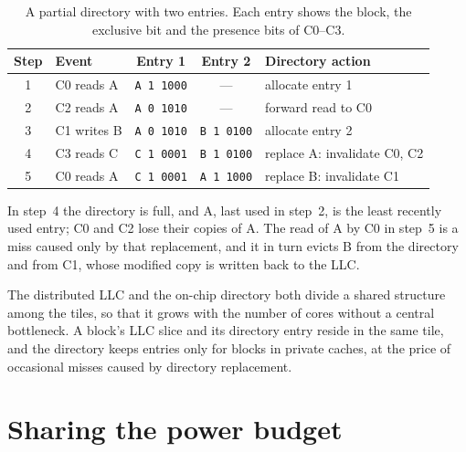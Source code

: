 \documentclass[../main.tex]{subfiles}
\begin{document}
\begin{table}[htbp]
  \centering\small
  \caption{A partial directory with two entries.  Each entry shows the
    block, the exclusive bit and the presence bits of C0--C3.}
  \label{tab:l22-directory-trace}
  \begin{tabular}{@{}clccl@{}}
    \toprule
    Step & Event & Entry 1 & Entry 2 & Directory action \\
    \midrule
    1 & C0 reads A  & \texttt{A 1 1000} & ---               & allocate entry 1 \\
    2 & C2 reads A  & \texttt{A 0 1010} & ---               & forward read to C0 \\
    3 & C1 writes B & \texttt{A 0 1010} & \texttt{B 1 0100} & allocate entry 2 \\
    4 & C3 reads C  & \texttt{C 1 0001} & \texttt{B 1 0100} & replace A: invalidate C0, C2 \\
    5 & C0 reads A  & \texttt{C 1 0001} & \texttt{A 1 1000} & replace B: invalidate C1 \\
    \bottomrule
  \end{tabular}
\end{table}

In step~4 the directory is full, and A, last used in step~2, is the least
recently used entry; C0 and C2 lose their copies of A.  The read of A by C0
in step~5 is a miss caused only by that replacement, and it in turn evicts B
from the directory and from C1, whose modified copy is written back to the
LLC.

\begin{keypoint}
  The distributed LLC and the on-chip directory both divide a shared
  structure among the tiles, so that it grows with the number of cores
  without a central bottleneck.  A block's LLC slice and its directory entry
  reside in the same tile, and the directory keeps entries only for blocks
  in private caches, at the price of occasional misses caused by directory
  replacement.
\end{keypoint}

\section{Sharing the power budget}
\label{sec:l22-power}
\end{document}
